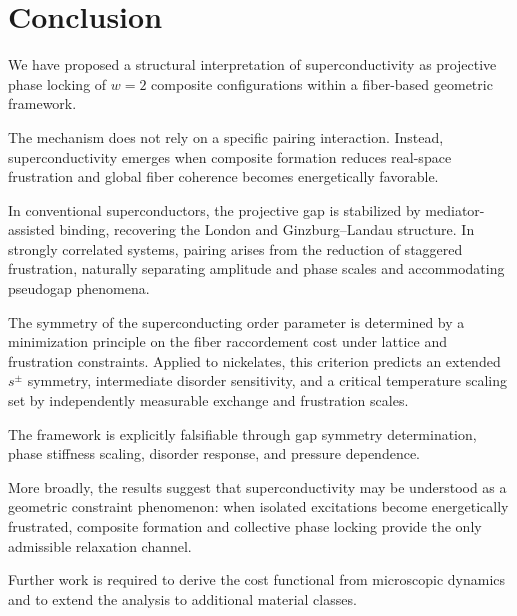 \section{Conclusion}
  \label{sec:conclusion}

  We have proposed a structural interpretation of superconductivity
  as projective phase locking of $w=2$ composite configurations
  within a fiber-based geometric framework.

  The mechanism does not rely on a specific pairing interaction.
  Instead, superconductivity emerges when composite formation
  reduces real-space frustration and global fiber coherence
  becomes energetically favorable.

  In conventional superconductors,
  the projective gap is stabilized by mediator-assisted binding,
  recovering the London and Ginzburg--Landau structure.
  In strongly correlated systems,
  pairing arises from the reduction of staggered frustration,
  naturally separating amplitude and phase scales
  and accommodating pseudogap phenomena.

  The symmetry of the superconducting order parameter
  is determined by a minimization principle
  on the fiber raccordement cost
  under lattice and frustration constraints.
  Applied to nickelates,
  this criterion predicts an extended $s^\pm$ symmetry,
  intermediate disorder sensitivity,
  and a critical temperature scaling
  set by independently measurable exchange and frustration scales.

  The framework is explicitly falsifiable
  through gap symmetry determination,
  phase stiffness scaling,
  disorder response,
  and pressure dependence.

  More broadly,
  the results suggest that superconductivity
  may be understood as a geometric constraint phenomenon:
  when isolated excitations become energetically frustrated,
  composite formation and collective phase locking
  provide the only admissible relaxation channel.

  Further work is required
  to derive the cost functional from microscopic dynamics
  and to extend the analysis to additional material classes.
